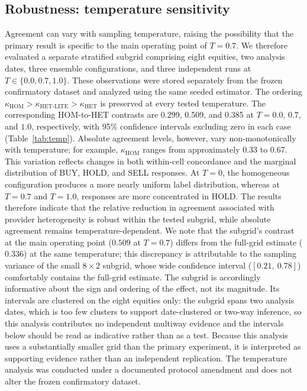 \documentclass{ieeeaccess}
\begin{document}
\subsection{Robustness: temperature sensitivity}
Agreement can vary with sampling temperature, raising the possibility that the
primary result is specific to the main operating point of $T=0.7$. We therefore
evaluated a separate stratified subgrid comprising eight equities, two analysis
dates, three ensemble configurations, and three independent runs at
$T\in\{0.0,0.7,1.0\}$. These observations were stored separately from the frozen
confirmatory dataset and analyzed using the same seeded estimator. The ordering
$\kappa_{\mathrm{HOM}}>\kappa_{\mathrm{HET\text{-}LITE}}>\kappa_{\mathrm{HET}}$
is preserved at every tested temperature. The corresponding HOM-to-HET contrasts
are 0.299, 0.509, and 0.385 at $T=0.0$, $0.7$, and $1.0$, respectively, with
95\% confidence intervals excluding zero in each case (Table~\ref{tab:temp}).
Absolute agreement levels, however, vary non-monotonically with temperature; for
example, $\kappa_{\mathrm{HOM}}$ ranges from approximately 0.33 to 0.67. This
variation reflects changes in both within-cell concordance and the marginal
distribution of BUY, HOLD, and SELL responses. At $T=0$, the homogeneous
configuration produces a more nearly uniform label distribution, whereas at
$T=0.7$ and $T=1.0$, responses are more concentrated in HOLD. The results
therefore indicate that the relative reduction in agreement associated with
provider heterogeneity is robust within the tested subgrid, while absolute
agreement remains temperature-dependent. We note that the subgrid's contrast at
the main operating point ($0.509$ at $T=0.7$) differs from the full-grid
estimate ($0.336$) at the same temperature; this discrepancy is attributable to
the sampling variance of the small $8\times 2$ subgrid, whose wide confidence
interval ($[0.21,\ 0.78]$) comfortably contains the full-grid estimate. The
subgrid is accordingly informative about the sign and ordering of the effect,
not its magnitude. Its intervals are clustered on the eight equities only: the
subgrid spans two analysis dates, which is too few clusters to support
date-clustered or two-way inference, so this analysis contributes no independent
multiway evidence and the intervals below should be read as indicative rather
than as a test. Because this analysis uses a substantially smaller grid than
the primary experiment, it is interpreted as supporting evidence rather than an
independent replication. The temperature
analysis was conducted under a documented protocol amendment and does not alter
the frozen confirmatory dataset.
\end{document}
